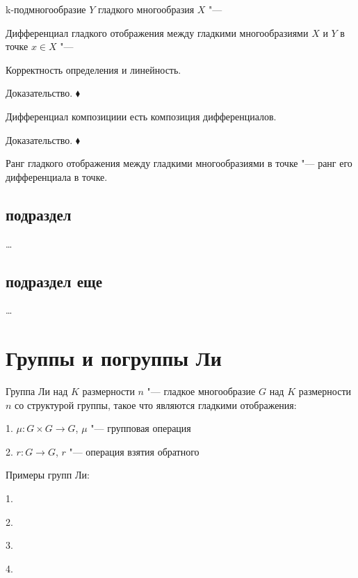 	\begin{definition} k-подмногообразие $Y$ гладкого многообразия $X$ "--- \end{definition}
	
	\begin{definition} Дифференциал гладкого отображения между гладкими многообразиями $X$ и $Y$ в точке $x \in X$ "--- \end{definition}
	
	\begin{theorem} Корректность определения и линейность. \end{theorem}
	Доказательство. $\blacklozenge$
	
	\begin{statement} Дифференциал композициии есть композиция дифференциалов. \end{statement}
	Доказательство. $\blacklozenge$
	
	\begin{definition} Ранг гладкого отображения между гладкими многообразиями в точке "--- ранг его дифференциала в точке. \end{definition}
	
	\subsection{подраздел}
	
	\dots
	
	\subsection*{подраздел еще}
	
	\dots
	
	\section{Группы и погруппы Ли}
	
	\begin{definition} Группа Ли над $K$ размерности $n$ "--- гладкое многообразие $G$ над $K$ размерности $n$ со структурой группы, такое что являются гладкими отображения: 
		
		1. $\mu:G\times G\rightarrow G$, $\mu$ "--- групповая операция
		
		2. $r:G\rightarrow G$, $r$ "--- операция взятия обратного
	\end{definition}
	
	\begin{examples} Примеры групп Ли:
	
	1.
		
	2.
		
	3.
		
	4.
	\end{examples}

